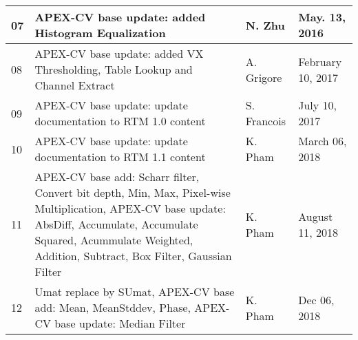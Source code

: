 \documentclass[oneside]{book}
\newcommand{\+}{\discretionary{\mbox{\scriptsize$\hookleftarrow$}}{}{}}
\begin{document}
\begin{table}[h]
\begin{tabular}{|p{1cm}|p{8cm}|p{2.5cm}|p{2.5cm}|}
07                                                             & APEX-CV base update: added Histogram Equalization                                                                         & N. Zhu                                                        & May. 13, 2016                                             \\ \hline
08                                                             & APEX-CV base update: added VX Thresholding, Table Lookup and Channel Extract                                              & A. Grigore                                                    & February 10, 2017                                         \\ \hline
09                                                             & APEX-CV base update: update documentation to RTM 1.0 content                                                              & S. Francois                                                   & July 10, 2017                                             \\ \hline
10                                                             & APEX-CV base update: update documentation to RTM 1.1 content                                                              & K. Pham                                                        & March 06, 2018                                               \\ \hline
11                                                             & APEX-CV base add: Scharr filter, Convert bit depth, Min, Max, Pixel-wise Multiplication, APEX-CV base update: AbsDiff, Accumulate, Accumulate Squared, Acummulate Weighted, Addition, Subtract, Box Filter, Gaussian Filter                                                       & K. Pham                                                        & August 11, 2018                                               \\ \hline
12                                                             & Umat replace by SUmat, APEX-CV base add: Mean, MeanStddev, Phase, APEX-CV base update: Median Filter                                                        & K. Pham                                                        & Dec 06, 2018                                               \\ \hline
\end{tabular}
\end{table}
\renewcommand{\arraystretch}{1}
\end{document}
